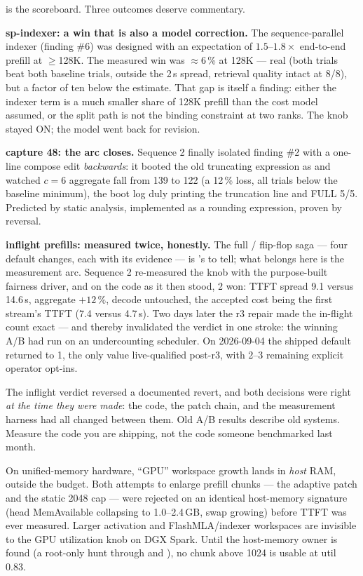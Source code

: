  is the scoreboard. Three outcomes deserve commentary.

\textbf{sp-indexer: a win that is also a model correction.} The
sequence-parallel indexer (finding \#6) was designed with an expectation of
$1.5$--$1.8\times$ end-to-end prefill at $\geq$128K. The measured win was
$\approx$6\,\% at 128K --- real (both trials beat both baseline trials, outside
the 2\,s spread, retrieval quality intact at 8/8), but a factor of ten below
the estimate. That gap is itself a finding: either the indexer term is a much
smaller share of 128K prefill than the cost model assumed, or the split path is
not the binding constraint at two ranks. The knob stayed ON; the model went
back for revision.

\textbf{capture 48: the arc closes.} Sequence 2 finally isolated finding \#2
with a one-line compose edit \emph{backwards}: it booted the old truncating
expression as  and watched $c=6$ aggregate fall from 139 to
122 (a 12\,\% loss, all trials below the baseline minimum), the boot log
duly printing the truncation line and FULL 5/5. Predicted by static analysis,
implemented as a rounding expression, proven by reversal.

\textbf{inflight prefills: measured twice, honestly.} The full
/ flip-flop saga --- four default changes, each
with its evidence --- is 's to tell; what belongs here is the
measurement arc. Sequence 2 re-measured the knob with the purpose-built
fairness driver, and on the code as it then stood, 2 won: TTFT spread 9.1
versus 14.6\,s, aggregate $+12\,\%$, decode untouched, the accepted cost
being the first stream's TTFT (7.4 versus 4.7\,s). Two days later the
 r3 repair made the in-flight count exact --- and thereby
invalidated the verdict in one stroke: the winning A/B had run on an
undercounting scheduler. On 2026-09-04 the shipped default returned
to 1, the only value live-qualified post-r3, with 2--3 remaining explicit
operator opt-ins.

\begin{hblesson}
The inflight verdict reversed a documented revert, and both decisions were
right \emph{at the time they were made}: the code, the patch chain, and the
measurement harness had all changed between them. Old A/B results describe old
systems. Measure the code you are shipping, not the code someone benchmarked
last month.
\end{hblesson}

\begin{hbwarning}
On unified-memory hardware, ``GPU'' workspace growth lands in \emph{host} RAM,
outside the  budget. Both attempts to
enlarge prefill chunks --- the adaptive patch and the static 2048 cap --- were
rejected on an identical host-memory signature (head MemAvailable collapsing to
1.0--2.4\,GB, swap growing) before TTFT was ever measured. Larger activation
and FlashMLA/indexer workspaces are invisible to the GPU utilization knob on
DGX Spark. Until the host-memory owner is found (a root-only hunt through
 and ), no chunk above 1024 is usable at util 0.83.
\end{hbwarning}

